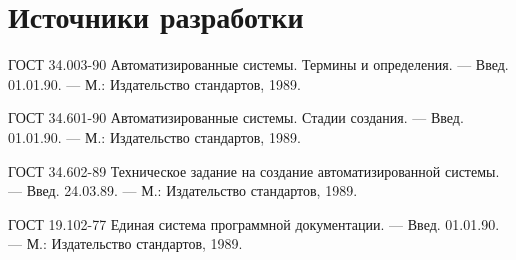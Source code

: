 \chapter{\enskip Источники разработки}

\par
	ГОСТ 34.003-90 Автоматизированные системы. Термины и определения. — Введ. 01.01.90. — М.: Издательство стандартов, 1989. 

	ГОСТ 34.601-90 Автоматизированные системы. Стадии создания. — Введ. 01.01.90. — М.: Издательство стандартов, 1989. 

	ГОСТ 34.602-89 Техническое задание на создание автоматизированной системы. — Введ. 24.03.89. — М.: Издательство стандартов, 1989. 
	
	ГОСТ 19.102-77 Единая система программной документации. — Введ. 01.01.90. — М.: Издательство стандартов, 1989.
